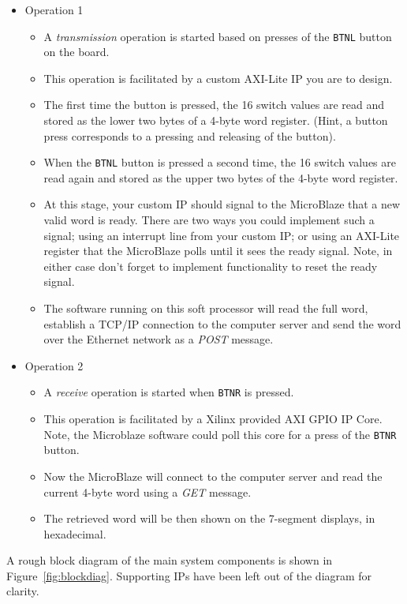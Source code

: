 \documentclass[11pt]{article}
\begin{document}
\begin{itemize}
\item Operation 1
\begin{itemize}
\item A \emph{transmission} operation is started based on presses of the \verb|BTNL| button on the board.
\item This operation is facilitated by a custom AXI-Lite IP you are to design.
\item The first time the button is pressed, the 16 switch values are read and stored as the lower two bytes of a 4-byte word register. (Hint, a button press corresponds to a pressing and releasing of the button).
\item When the \verb|BTNL| button is pressed a second time, the 16 switch values are read again and stored as the upper two bytes of the 4-byte word register.
\item At this stage, your custom IP should signal to the MicroBlaze that a new valid word is ready. There are two ways you could implement such a signal; using an interrupt line from your custom IP; or using an AXI-Lite register that the MicroBlaze polls until it sees the ready signal. Note, in either case don't forget to implement functionality to reset the ready signal.
\item The software running on this soft processor will read the full word, establish a TCP/IP connection to the computer server and send the word over the Ethernet network as a \textit{POST} message.
\end{itemize}
\item Operation 2
\begin{itemize}
\item A \emph{receive} operation is started when \verb|BTNR| is pressed.
\item This operation is facilitated by a Xilinx provided AXI GPIO IP Core. Note, the Microblaze software could poll this core for a press of the \verb|BTNR| button.
\item Now the MicroBlaze will connect to the computer server and read the current 4-byte word using a \textit{GET} message.
\item The retrieved word will be then shown on the 7-segment displays, in hexadecimal.
\end{itemize}

\end{itemize}

A rough block diagram of the main system components is shown in Figure~\ref{fig:blockdiag}.
Supporting IPs have been left out of the diagram for clarity.
\end{document}
